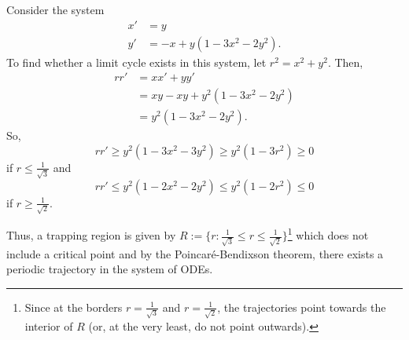 \begin{eg}
	Consider the system
	\begin{align*}
		x' &= y \\
		y' &= -x + y(1-3x^2-2y^2).
	\end{align*}
	To find whether a limit cycle exists in this system, let $r^2 = x^2 + y^2$. Then,
	\begin{align*}
		rr' & = xx' + yy' \\
		& = xy - xy + y^2(1-3x^2-2y^2) \\
		& = y^2(1-3x^2-2y^2).
	\end{align*}
	So, 
	\[
	rr' \geq y^2(1 - 3x^2 - 3y^2) \geq y^2(1-3r^2) \geq 0 
	\] if $r \leq \frac{1}{\sqrt{3}}$
	and
	\[
	rr' \leq y^2(1 - 2x^2 - 2y^2) \leq y^2(1-2r^2) \leq 0 
	\] if $r \geq \frac{1}{\sqrt{2}}$.
	
	Thus, a trapping region is given by $R := \{r: \frac{1}{\sqrt{3}} \leq r \leq \frac{1}{\sqrt{2}}\}$\footnote{Since at the borders $r=\frac{1}{\sqrt{3}}$ and $r=\frac{1}{\sqrt{2}}$, the trajectories point towards the interior of $R$ (or, at the very least, do not point outwards).} which does not include a critical point and by the Poincaré-Bendixson theorem, there exists a periodic trajectory in the system of ODEs.
\end{eg}